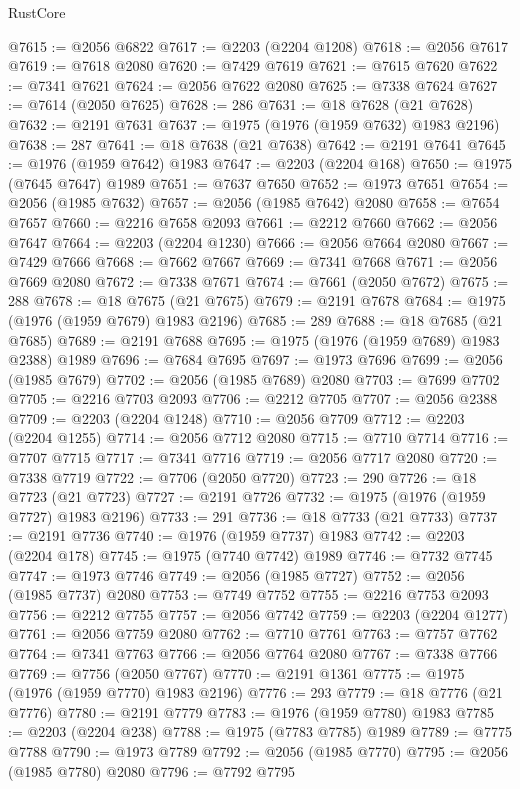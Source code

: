 \begin{lexlean}{RustCore}
\begin{coremodule}
@7615 := @2056 @6822
@7617 := @2203 (@2204 @1208)
@7618 := @2056 @7617
@7619 := @7618 @2080
@7620 := @7429 @7619
@7621 := @7615 @7620
@7622 := @7341 @7621
@7624 := @2056 @7622 @2080
@7625 := @7338 @7624
@7627 := @7614 (@2050 @7625)
@7628 := 286
@7631 := @18 @7628 (@21 @7628)
@7632 := @2191 @7631
@7637 := @1975 (@1976 (@1959 @7632) @1983 @2196)
@7638 := 287
@7641 := @18 @7638 (@21 @7638)
@7642 := @2191 @7641
@7645 := @1976 (@1959 @7642) @1983
@7647 := @2203 (@2204 @168)
@7650 := @1975 (@7645 @7647) @1989
@7651 := @7637 @7650
@7652 := @1973 @7651
@7654 := @2056 (@1985 @7632)
@7657 := @2056 (@1985 @7642) @2080
@7658 := @7654 @7657
@7660 := @2216 @7658 @2093
@7661 := @2212 @7660
@7662 := @2056 @7647
@7664 := @2203 (@2204 @1230)
@7666 := @2056 @7664 @2080
@7667 := @7429 @7666
@7668 := @7662 @7667
@7669 := @7341 @7668
@7671 := @2056 @7669 @2080
@7672 := @7338 @7671
@7674 := @7661 (@2050 @7672)
@7675 := 288
@7678 := @18 @7675 (@21 @7675)
@7679 := @2191 @7678
@7684 := @1975 (@1976 (@1959 @7679) @1983 @2196)
@7685 := 289
@7688 := @18 @7685 (@21 @7685)
@7689 := @2191 @7688
@7695 := @1975 (@1976 (@1959 @7689) @1983 @2388) @1989
@7696 := @7684 @7695
@7697 := @1973 @7696
@7699 := @2056 (@1985 @7679)
@7702 := @2056 (@1985 @7689) @2080
@7703 := @7699 @7702
@7705 := @2216 @7703 @2093
@7706 := @2212 @7705
@7707 := @2056 @2388
@7709 := @2203 (@2204 @1248)
@7710 := @2056 @7709
@7712 := @2203 (@2204 @1255)
@7714 := @2056 @7712 @2080
@7715 := @7710 @7714
@7716 := @7707 @7715
@7717 := @7341 @7716
@7719 := @2056 @7717 @2080
@7720 := @7338 @7719
@7722 := @7706 (@2050 @7720)
@7723 := 290
@7726 := @18 @7723 (@21 @7723)
@7727 := @2191 @7726
@7732 := @1975 (@1976 (@1959 @7727) @1983 @2196)
@7733 := 291
@7736 := @18 @7733 (@21 @7733)
@7737 := @2191 @7736
@7740 := @1976 (@1959 @7737) @1983
@7742 := @2203 (@2204 @178)
@7745 := @1975 (@7740 @7742) @1989
@7746 := @7732 @7745
@7747 := @1973 @7746
@7749 := @2056 (@1985 @7727)
@7752 := @2056 (@1985 @7737) @2080
@7753 := @7749 @7752
@7755 := @2216 @7753 @2093
@7756 := @2212 @7755
@7757 := @2056 @7742
@7759 := @2203 (@2204 @1277)
@7761 := @2056 @7759 @2080
@7762 := @7710 @7761
@7763 := @7757 @7762
@7764 := @7341 @7763
@7766 := @2056 @7764 @2080
@7767 := @7338 @7766
@7769 := @7756 (@2050 @7767)
@7770 := @2191 @1361
@7775 := @1975 (@1976 (@1959 @7770) @1983 @2196)
@7776 := 293
@7779 := @18 @7776 (@21 @7776)
@7780 := @2191 @7779
@7783 := @1976 (@1959 @7780) @1983
@7785 := @2203 (@2204 @238)
@7788 := @1975 (@7783 @7785) @1989
@7789 := @7775 @7788
@7790 := @1973 @7789
@7792 := @2056 (@1985 @7770)
@7795 := @2056 (@1985 @7780) @2080
@7796 := @7792 @7795

\end{coremodule}
\end{lexlean}
